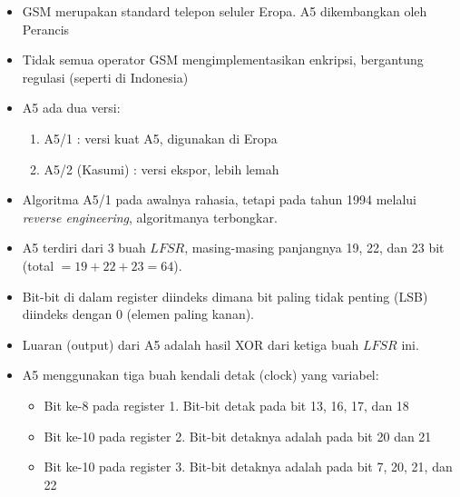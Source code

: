 \documentclass{article}
\begin{document}
\newpage


\begin{itemize}
    \item GSM merupakan standard telepon seluler Eropa. A5 dikembangkan oleh Perancis
    \item Tidak semua operator GSM mengimplementasikan enkripsi, bergantung regulasi (seperti di Indonesia)
    \item A5 ada dua versi:
    \begin{enumerate}
        \item A5/1 : versi kuat A5, digunakan di Eropa
        \item A5/2 (Kasumi) : versi ekspor, lebih lemah
    \end{enumerate}
    \item Algoritma A5/1 pada awalnya rahasia, tetapi pada tahun 1994 melalui \textit{reverse engineering}, algoritmanya terbongkar.
\end{itemize}

\newpage


\begin{itemize}
    \item A5 terdiri dari 3 buah $LFSR$, masing-masing panjangnya 19, 22, dan 23 bit (total $= 19 + 22 + 23 = 64$).
    \item Bit-bit di dalam register diindeks dimana bit paling tidak penting (LSB) diindeks dengan 0 (elemen paling kanan).
    \item Luaran (output) dari A5 adalah hasil XOR dari ketiga buah $LFSR$ ini.
    \item A5 menggunakan tiga buah kendali detak (clock) yang variabel:
    \begin{itemize}
        \item Bit ke-8 pada register 1. Bit-bit detak pada bit 13, 16, 17, dan 18
        \item Bit ke-10 pada register 2. Bit-bit detaknya adalah pada bit 20 dan 21
        \item Bit ke-10 pada register 3. Bit-bit detaknya adalah pada bit 7, 20, 21, dan 22
    \end{itemize}
\end{itemize}

\newpage


\end{document}
